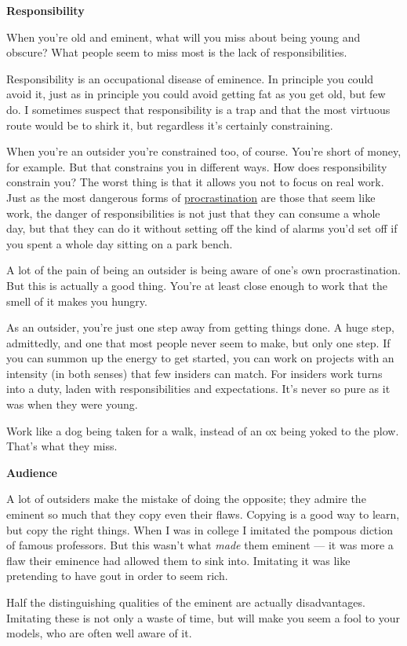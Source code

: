 \textbf{Responsibility}

When you're old and eminent, what will you miss about being young and
obscure? What people seem to miss most is the lack of responsibilities.

Responsibility is an occupational disease of eminence. In principle you
could avoid it, just as in principle you could avoid getting fat as you
get old, but few do. I sometimes suspect that responsibility is a trap
and that the most virtuous route would be to shirk it, but regardless
it's certainly constraining.

When you're an outsider you're constrained too, of course. You're short
of money, for example. But that constrains you in different ways. How
does responsibility constrain you? The worst thing is that it allows you
not to focus on real work. Just as the most dangerous forms of
\href{procrastination.html}{procrastination} are those that seem like
work, the danger of responsibilities is not just that they can consume a
whole day, but that they can do it without setting off the kind of
alarms you'd set off if you spent a whole day sitting on a park bench.

A lot of the pain of being an outsider is being aware of one's own
procrastination. But this is actually a good thing. You're at least
close enough to work that the smell of it makes you hungry.

As an outsider, you're just one step away from getting things done. A
huge step, admittedly, and one that most people never seem to make, but
only one step. If you can summon up the energy to get started, you can
work on projects with an intensity (in both senses) that few insiders
can match. For insiders work turns into a duty, laden with
responsibilities and expectations. It's never so pure as it was when
they were young.

Work like a dog being taken for a walk, instead of an ox being yoked to
the plow. That's what they miss.

\textbf{Audience}

A lot of outsiders make the mistake of doing the opposite; they admire
the eminent so much that they copy even their flaws. Copying is a good
way to learn, but copy the right things. When I was in college I
imitated the pompous diction of famous professors. But this wasn't what
\emph{made} them eminent --- it was more a flaw their eminence had
allowed them to sink into. Imitating it was like pretending to have gout
in order to seem rich.

Half the distinguishing qualities of the eminent are actually
disadvantages. Imitating these is not only a waste of time, but will
make you seem a fool to your models, who are often well aware of it.

